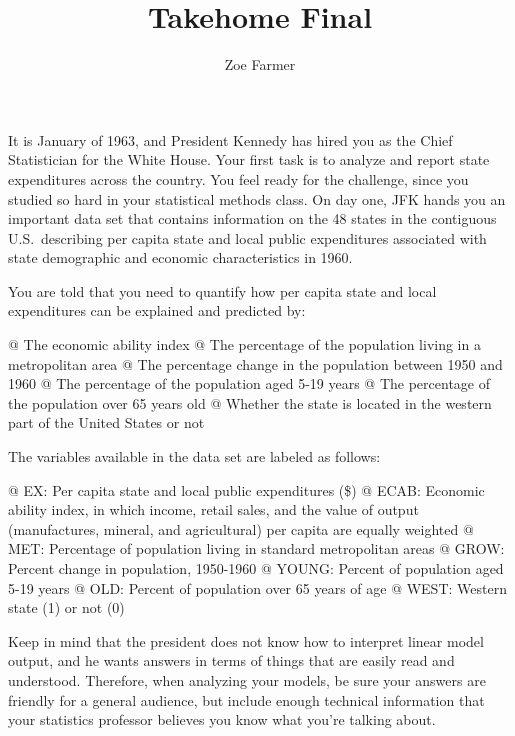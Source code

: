 \documentclass[10pt]{article}\usepackage[]{graphicx}\usepackage[]{xcolor}
\title{Takehome Final}
\author{Zoe Farmer}
\begin{document}
\maketitle



It is January of 1963, and President Kennedy has hired you as the Chief Statistician for the White House.  Your first
task is to analyze and report state expenditures across the country. You feel ready for the challenge, since you studied
so hard in your statistical methods class. On day one, JFK hands you an important data set that contains information on
the 48 states in the contiguous U.S.\ describing per capita state and local public expenditures associated with state
demographic and economic characteristics in 1960.\newline

\noindent You are told that you need to quantify how per capita state and local expenditures can be explained and
predicted by:

\begin{easylist}[itemize]
    @ The economic ability index
    @ The percentage of the population living in a metropolitan area
    @ The percentage change in the population between 1950 and 1960
    @ The percentage of the population aged 5-19 years
    @ The percentage of the population over 65 years old
    @ Whether the state is located in the western part of the United States or not
\end{easylist}

\vspace{0.5cm}

\noindent The variables available in the data set are labeled as follows:

\begin{easylist}[enumerate]
    @ EX: Per capita state and local public expenditures (\$)
    @ ECAB: Economic ability index, in which income, retail sales, and the value of output (manufactures, mineral, and
    agricultural) per capita are equally weighted
    @ MET: Percentage of population living in standard metropolitan areas
    @ GROW: Percent change in population, 1950-1960
    @ YOUNG: Percent of population aged 5-19 years
    @ OLD: Percent of population over 65 years of age
    @ WEST: Western state (1) or not (0)
\end{easylist}

\vspace{0.5cm}

\noindent Keep in mind that the president does not know how to interpret linear model output, and he wants answers in
terms of things that are easily read and understood. Therefore, when analyzing your models, be sure your answers are
friendly for a general audience, but include enough technical information that your statistics professor believes you
know what you're talking about.
\end{document}
